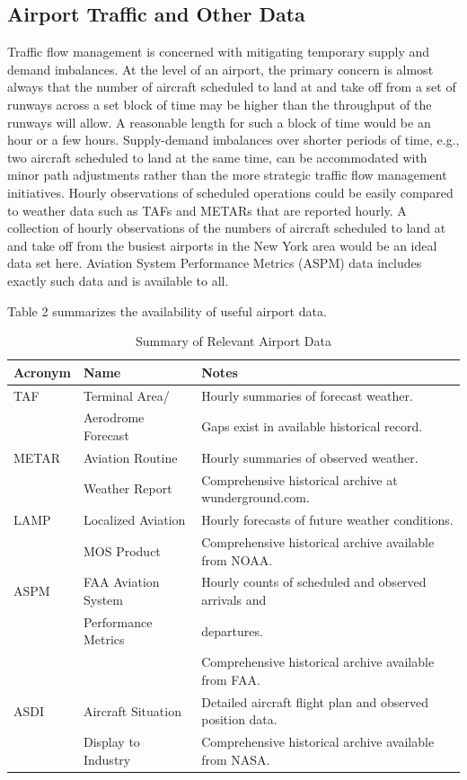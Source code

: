 \documentclass[11pt]{scrartcl}
\begin{document}
\subsection{Airport Traffic and Other Data}
Traffic flow management is concerned with mitigating temporary supply and demand imbalances. At the level of an airport, the primary concern is almost always that the number of aircraft scheduled to land at and take off from a set of runways across a set block of time may be higher than the throughput of the runways will allow. A reasonable length for such a block of time would be an hour or a few hours. Supply-demand imbalances over shorter periods of time, e.g., two aircraft scheduled to land at the same time, can be accommodated with minor path adjustments rather than the more strategic traffic flow management initiatives. Hourly observations of scheduled operations could be easily compared to weather data such as TAFs and METARs that are reported hourly. A collection of hourly observations of the numbers of aircraft scheduled to land at and take off from the busiest airports in the New York area would be an ideal data set here.  Aviation System Performance Metrics (ASPM) data includes exactly such data and is available to all.

Table 2 summarizes the availability of useful airport data.

\begin{table}[htdp]
\caption{Summary of Relevant Airport Data}
\begin{center}
\begin{tabular}{|l|l|l|}
\hline
{\bf Acronym} & {\bf Name} & {\bf Notes}\\
\hline
TAF & Terminal Area/& Hourly summaries of forecast weather.\\
& Aerodrome Forecast & Gaps exist in available historical record.\\
\hline
METAR & Aviation Routine & Hourly summaries of observed weather.\\
& Weather Report & Comprehensive historical archive at wunderground.com.\\
\hline
LAMP & Localized Aviation & Hourly forecasts of future weather conditions.\\
& MOS Product & Comprehensive historical archive available from NOAA.\\
\hline
ASPM & FAA Aviation System & Hourly counts of scheduled and observed arrivals and\\
& Performance Metrics & departures.\\
& & Comprehensive historical archive available from FAA.\\
\hline
ASDI & Aircraft Situation & Detailed aircraft flight plan and observed position data.\\
& Display to Industry & Comprehensive historical archive available from NASA.\\
\hline
\end{tabular}
\end{center}
\label{default}
\end{table}
\end{document}
